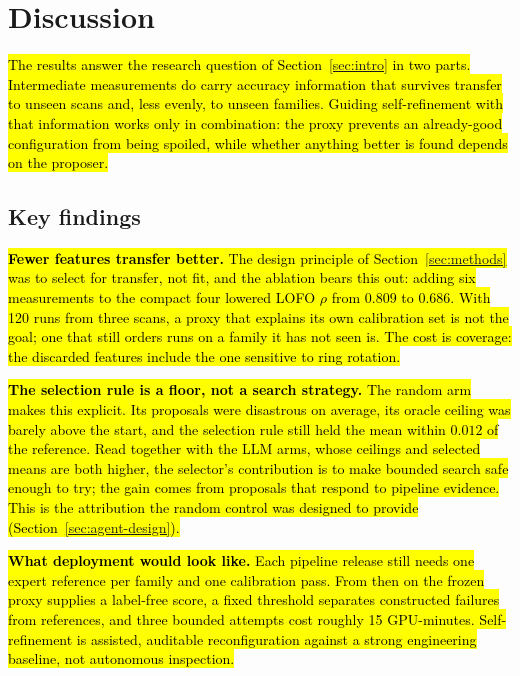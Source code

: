 \documentclass[a4paper,fleqn]{cas-dc}
\begin{document}
{%
\section{Discussion}\label{sec:discussion}

\hl{The results answer the research question of Section~\ref{sec:intro} in two parts. Intermediate measurements do carry accuracy information that survives transfer to unseen scans and, less evenly, to unseen families. Guiding self-refinement with that information works only in combination: the proxy prevents an already-good configuration from being spoiled, while whether anything better is found depends on the proposer.}

\subsection{Key findings}

\hl{\textbf{Fewer features transfer better.} The design principle of Section~\ref{sec:methods} was to select for transfer, not fit, and the ablation bears this out: adding six measurements to the compact four lowered LOFO $\rho$ from $0.809$ to $0.686$. With 120 runs from three scans, a proxy that explains its own calibration set is not the goal; one that still orders runs on a family it has not seen is. The cost is coverage: the discarded features include the one sensitive to ring rotation.}

\hl{\textbf{The selection rule is a floor, not a search strategy.} The random arm makes this explicit. Its proposals were disastrous on average, its oracle ceiling was barely above the start, and the selection rule still held the mean within $0.012$ of the reference. Read together with the LLM arms, whose ceilings and selected means are both higher, the selector's contribution is to make bounded search safe enough to try; the gain comes from proposals that respond to pipeline evidence. This is the attribution the random control was designed to provide (Section~\ref{sec:agent-design}).}

\hl{\textbf{What deployment would look like.} Each pipeline release still needs one expert reference per family and one calibration pass. From then on the frozen proxy supplies a label-free score, a fixed threshold separates constructed failures from references, and three bounded attempts cost roughly 15 GPU-minutes. Self-refinement is assisted, auditable reconfiguration against a strong engineering baseline, not autonomous inspection.}

}
\end{document}
